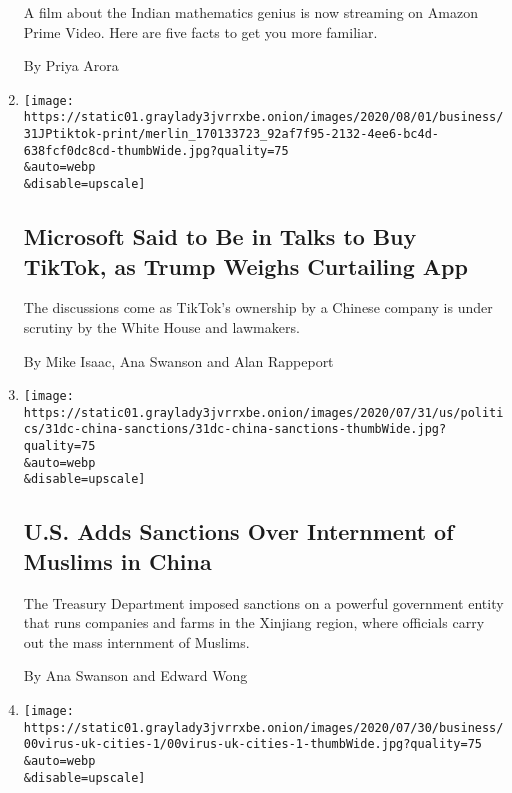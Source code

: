 \begin{enumerate}
  A film about the Indian mathematics genius is now streaming on Amazon
  Prime Video. Here are five facts to get you more familiar.

  By Priya Arora
\item
  \href{/2020/07/31/technology/tiktok-microsoft.html}{}

  \texttt{[image: https://static01.graylady3jvrrxbe.onion/images/2020/08/01/business/31JPtiktok-print/merlin\_170133723\_92af7f95-2132-4ee6-bc4d-638fcf0dc8cd-thumbWide.jpg?quality=75\\\&auto=webp\\\&disable=upscale]}

  \hypertarget{microsoft-said-to-be-in-talks-to-buy-tiktok-as-trump-weighs-curtailing-app}{%
  \subsection{Microsoft Said to Be in Talks to Buy TikTok, as Trump
  Weighs Curtailing
  App}\label{microsoft-said-to-be-in-talks-to-buy-tiktok-as-trump-weighs-curtailing-app}}

  The discussions come as TikTok's ownership by a Chinese company is
  under scrutiny by the White House and lawmakers.

  By Mike Isaac, Ana Swanson and Alan Rappeport
\item
  \href{/2020/07/31/us/politics/sanctions-china-xinjiang-uighurs.html}{}

  \texttt{[image: https://static01.graylady3jvrrxbe.onion/images/2020/07/31/us/politics/31dc-china-sanctions/31dc-china-sanctions-thumbWide.jpg?quality=75\\\&auto=webp\\\&disable=upscale]}

  \hypertarget{us-adds-sanctions-over-internment-of-muslims-in-china}{%
  \subsection{U.S. Adds Sanctions Over Internment of Muslims in
  China}\label{us-adds-sanctions-over-internment-of-muslims-in-china}}

  The Treasury Department imposed sanctions on a powerful government
  entity that runs companies and farms in the Xinjiang region, where
  officials carry out the mass internment of Muslims.

  By Ana Swanson and Edward Wong
\item
  \href{/2020/07/31/business/britain-economic-comeback-suburbs.html}{}

  \texttt{[image: https://static01.graylady3jvrrxbe.onion/images/2020/07/30/business/00virus-uk-cities-1/00virus-uk-cities-1-thumbWide.jpg?quality=75\\\&auto=webp\\\&disable=upscale]}


\end{enumerate}
